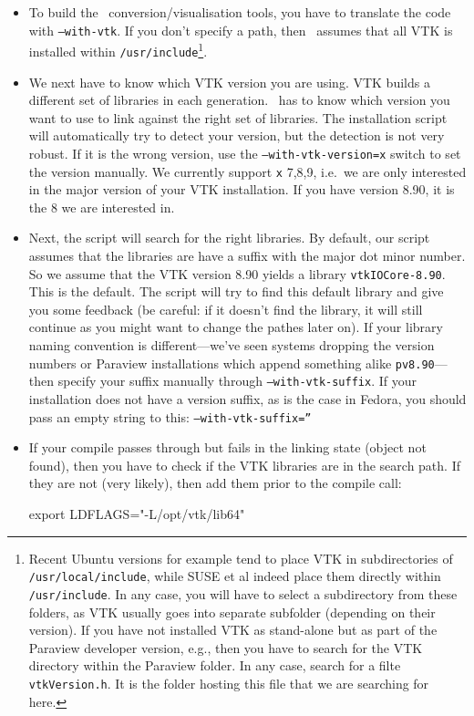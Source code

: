 \begin{itemize}
  \item To build the \Peano\ conversion/visualisation tools, you have to
  translate the code with \texttt{--with-vtk}. If you don't
  specify a path, then \Peano\ assumes that all VTK is installed 
  within \texttt{/usr/include}\footnote{Recent Ubuntu
  versions for example tend to place VTK in subdirectories of
  \texttt{/usr/local/include}, while SUSE et al indeed place them directly
  within \texttt{/usr/include}. In any case, you will have to select a
  subdirectory from these folders, as VTK usually goes into separate subfolder (depending on their
  version). If you have not installed VTK as stand-alone but as part of the
  Paraview developer version, e.g., then you have to search for the VTK
  directory within the Paraview folder. In any case, search for a
  filte \texttt{vtkVersion.h}. It is the folder hosting this file that we are
  searching for here.}.
  \item We next have to know which VTK version you are using. VTK builds a
  different set of libraries in each generation. \Peano\ has to know which
  version you want to use to link against the right set of libraries. The
  installation script will automatically try to detect your version, but the
  detection is not very robust. If it is the wrong version, use the
  \texttt{--with-vtk-version=x} switch to set the version manually. We currently
  support \texttt{x} 7,8,9, i.e.~we are only interested in the major version of
  your VTK installation. If you have version 8.90, it is the 8 we are interested
  in.
  \item Next, the script will search for the right libraries. By default, our
  script assumes that the libraries are have a suffix with the major dot minor
  number. So we assume that the VTK version 8.90 yields a library
  \texttt{vtkIOCore-8.90}. This is the default. The script will try to find this
  default library and give you some feedback (be careful: if it doesn't find
  the library, it will still continue as you might want to change the pathes
  later on). If your library naming convention is different---we've seen
  systems dropping the version numbers or Paraview installations which append
  something alike \texttt{pv8.90}---then specify your suffix manually through
  \texttt{--with-vtk-suffix}. If your installation does not have a version suffix,
  as is the case in Fedora, you should pass an empty string to this:
  \texttt{--with-vtk-suffix=''}
  \item If your compile passes through but fails in the linking state (object
  not found), then you have to check if the VTK libraries are in the search
  path. If they are not (very likely), then add them prior to the compile call:
\begin{code}
export LDFLAGS="-L/opt/vtk/lib64"
\end{code}
\end{itemize}


